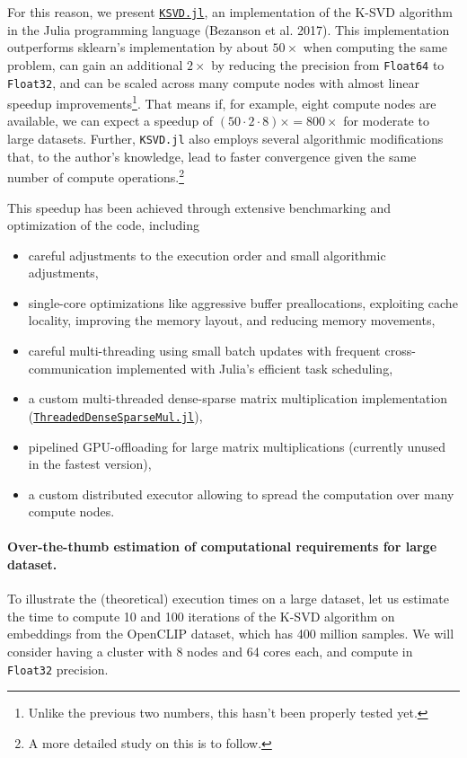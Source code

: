 \documentclass[11pt]{article}
\makeatletter
\newcommand{\cslcitation}[2]
 {\protect\hyper@linkstart{cite}{citeproc_bib_item_#1}#2\hyper@linkend}
\makeatother
\begin{document}
For this reason, we present \href{https://github.com/RomeoV/KSVD.jl}{\texttt{KSVD.jl}}, an implementation of the K-SVD algorithm in the Julia programming language (\cslcitation{2}{Bezanson et al. 2017}).
This implementation outperforms sklearn's implementation by about \(50\times\) when computing the same problem, can gain an additional \(2\times\) by reducing the precision from \texttt{Float64} to \texttt{Float32}, and can be scaled across many compute nodes with almost linear speedup improvements\footnote{Unlike the previous two numbers, this hasn't been properly tested yet.}.
That means if, for example, eight compute nodes are available, we can expect a speedup of \((50 \cdot 2 \cdot 8)\times = 800\times\) for moderate to large datasets.
Further, \texttt{KSVD.jl} also employs several algorithmic modifications that, to the author's knowledge, lead to faster convergence given the same number of compute operations.\footnote{A more detailed study on this is to follow.}

This speedup has been achieved through extensive benchmarking and optimization of the code, including
\begin{itemize}
\item careful adjustments to the execution order and small algorithmic adjustments,
\item single-core optimizations like aggressive buffer preallocations, exploiting cache locality, improving the memory layout, and reducing memory movements,
\item careful multi-threading using small batch updates with frequent cross-communication implemented with Julia's efficient task scheduling,
\item a custom multi-threaded dense-sparse matrix multiplication implementation (\href{https://github.com/RomeoV/ThreadedDenseSparseMul.jl}{\texttt{ThreadedDenseSparseMul.jl}}),
\item pipelined GPU-offloading for large matrix multiplications (currently unused in the fastest version),
\item a custom distributed executor allowing to spread the computation over many compute nodes.
\end{itemize}
\paragraph*{Over-the-thumb estimation of computational requirements for large dataset.}
\label{sec:org1d75d6b}
To illustrate the (theoretical) execution times on a large dataset, let us estimate the time to compute 10 and 100 iterations of the K-SVD algorithm on embeddings from the OpenCLIP dataset, which has 400 million samples.
We will consider having a cluster with 8 nodes and 64 cores each, and compute in \texttt{Float32} precision.
\end{document}
